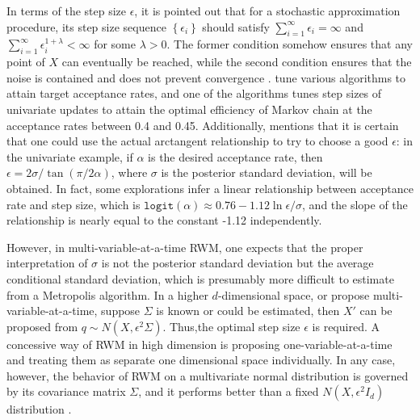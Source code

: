 In terms of the step size $\epsilon$, it is pointed out that for a stochastic approximation procedure, its step size sequence $\left\lbrace \epsilon_i\right\rbrace$ should satisfy $\sum_{i=1}^\infty \epsilon_i=\infty $ and $\sum_{i=1}^\infty \epsilon_i^{1+\lambda}<\infty $ for some $\lambda>0$. The former condition somehow ensures that any point of $X$ can eventually be reached, while the second condition ensures that the noise is contained and does not prevent convergence \citep{andrieu2008tutorial}. \cite{sherlock2010random} tune various algorithms to attain target acceptance rates, and one of the algorithms tunes step sizes of univariate updates to attain the optimal efficiency of Markov chain at the acceptance rates between 0.4 and 0.45. Additionally, \cite{graves2011automatic} mentions that it is certain that one could use the actual arctangent relationship to try to choose a good $\epsilon$: in the univariate example, if $\alpha$ is the desired acceptance rate, then $\epsilon = 2\sigma / \tan \left(\pi/2\alpha\right)$, where $\sigma$ is the posterior standard deviation, will be obtained. In fact, some explorations infer a linear relationship between acceptance rate and step size, which is $\mathtt{logit}(\alpha) \approx 0.76-1.12\ln \epsilon/\sigma$, and the slope of the relationship is nearly equal to the constant -1.12 independently. 

However, in multi-variable-at-a-time RWM, one expects that the proper interpretation of $\sigma$ is not the posterior standard deviation but the average conditional standard deviation, which is presumably more difficult to estimate from a Metropolis algorithm. In a higher $d$-dimensional space, or propose multi-variable-at-a-time, suppose $\Sigma$ is known or could be estimated, then $X'$ can be proposed from $q\sim N\left(X,\epsilon^2\Sigma\right)$. Thus,the optimal step size $\epsilon$ is required. A concessive way of RWM in high dimension is proposing one-variable-at-a-time and treating them as separate one dimensional space individually. In any case, however, the behavior of RWM on a multivariate normal distribution is governed by its covariance matrix $\Sigma$, and it performs better than a fixed $N\left(X,\epsilon^2I_d\right)$ distribution \citep{roberts2001optimal}.


